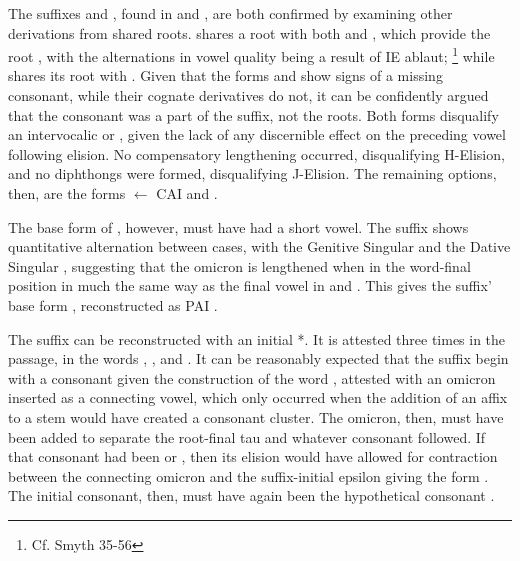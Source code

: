 The suffixes  and , found in  and ,
are both confirmed by examining other derivations from shared roots. 
shares a root with both  and , which provide
the root , with the alternations in vowel quality being a result
of IE ablaut; \footnote{Cf. Smyth 35-56} while  shares its root with
. Given that the forms  and  show signs
of a missing consonant, while their cognate derivatives do not, it can be
confidently argued that the consonant was a part of the suffix, not the roots.
Both forms disqualify an intervocalic  or , given the lack of any
discernible effect on the preceding vowel following elision.
No compensatory lengthening occurred, disqualifying H-Elision, and no
diphthongs were formed, disqualifying J-Elision. The remaining options, then,
are the forms  $\gets$ CAI  and
. 

The base form of , however, must have had a short vowel.
The suffix shows quantitative alternation between cases, with the
Genitive Singular  and the Dative Singular ,
suggesting that the omicron  is lengthened when in the
word-final position in much the same way as the final vowel in
 and . This gives the suffix' base form
, reconstructed as PAI .



The suffix  can be reconstructed with an initial *\w.
It is attested three times in the passage, in the words ,
, and .
It can be reasonably expected that the suffix begin with a consonant
given the construction of the word , attested with
an omicron  inserted as a connecting vowel, which only
occurred when the addition of an affix to a stem would have created a
consonant cluster. The omicron, then, must have been added to separate
the root-final tau  and whatever consonant followed.
If that consonant had been  or , then its elision would have
allowed for contraction between the connecting omicron 
and the suffix-initial epsilon  giving the form
. The initial consonant, then, must have again been the
hypothetical consonant \w.

